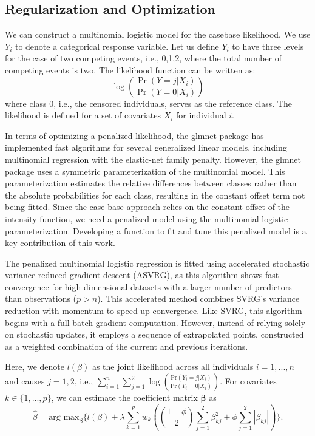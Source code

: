 \documentclass[AMA,Times1COL]{WileyNJDv5} %
\begin{document}
\subsection{Regularization and Optimization}

We can construct a multinomial logistic model for the casebase likelihood. We use $Y_{i}$ to denote a categorical response variable. Let us define $Y_{i}$ to have three levels for the case of two competing events, i.e., {0,1,2}, where the total number of competing events is two. The likelihood function can be written as:
$$\log\left(\frac{\Pr(Y=j|X_i)}{\Pr(Y=0|X_i)}\right)$$ where class 0, i.e., the censored individuals, serves as the reference class. The likelihood is defined for a set of covariates $X_{i}$ for individual $i$.

In terms of optimizing a penalized likelihood, the glmnet package has implemented fast algorithms for several generalized linear models, including multinomial regression with the elastic-net family penalty. However, the glmnet package uses a symmetric parameterization of the multinomial model. This parameterization estimates the relative differences between classes rather than the absolute probabilities for each class, resulting in the constant offset term not being fitted. Since the case base approach relies on the constant offset of the intensity function, we need a penalized model using the multinomial logistic parameterization. Developing a function to fit and tune this penalized model is a key contribution of this work.

The penalized multinomial logistic regression is fitted using accelerated stochastic variance reduced gradient descent (ASVRG), as this algorithm shows fast convergence for high-dimensional datasets with a larger number of predictors than observations ($p> n$). This accelerated method combines SVRG's variance reduction with momentum to speed up convergence.\cite{DriggsEhrhardtSchonlieb:2022} Like SVRG, this algorithm begins with a full-batch gradient computation. However, instead of relying solely on stochastic updates, it employs a sequence of extrapolated points, constructed as a weighted combination of the current and previous iterations.

Here, we denote $l(\beta)$ as the joint likelihood across all individuals $i=1,...,n$ and causes $j=1,2$, i.e., $\sum_{i=1}^{n}\sum_{j=1}^{2}\log(\frac{\text{Pr}(Y_{i}=j|X_{i})}{\text{Pr}(Y_{i}=0|X_{i})})$. For covariates $k\in\{1,...,p\}$, we can estimate the coefficient matrix $\boldsymbol{\beta}$ as
$$\hat{\beta}=\text{arg max}_{\beta}\{l(\beta)+\lambda\sum_{k=1}^{p}w_{k}((\frac{1-\phi}{2})\sum_{j=1}^{2}\beta_{kj}^{2}+\phi\sum_{j=1}^{2}|\beta_{kj}|)\}.$$
\end{document}
